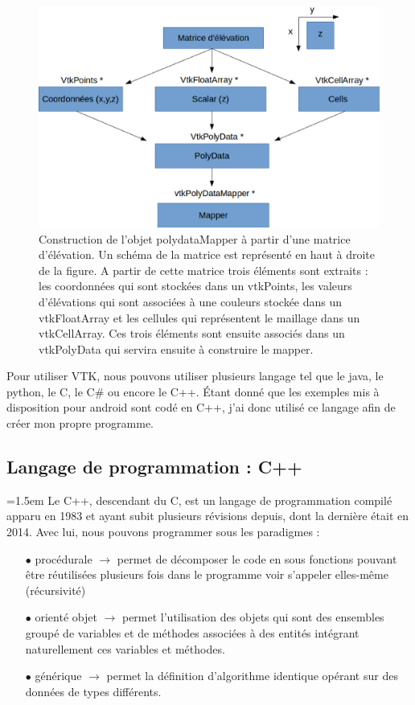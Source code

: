 \documentclass[a4paper,12pt]{article}
\begin{document}
\begin{figure}[h]
	\centering
	\includegraphics[width=15cm]{VTKMeth.eps}  
	\caption{Construction de l'objet polydataMapper à partir d'une matrice d'élévation. Un schéma de la matrice est représenté en haut à droite de la figure. A partir de cette matrice trois éléments sont extraits : les coordonnées qui sont stockées dans un vtkPoints, les valeurs d'élévations qui sont associées à une couleurs stockée dans un vtkFloatArray et les cellules qui représentent le maillage dans un vtkCellArray. Ces trois éléments sont ensuite associés dans un vtkPolyData qui servira ensuite à construire le mapper.}
	\label{fig:VTKMeth}
\end{figure} 

Pour utiliser VTK, nous pouvons utiliser plusieurs langage tel que le java, le python, le C, le C\# ou encore le C++. Étant donné que les exemples mis à disposition pour android sont codé en C++, j'ai donc utilisé ce langage afin de créer mon propre programme.
	\subsection{Langage de programmation : C++}	
\parindent=1.5em
	Le C++, descendant du C, est un langage de programmation compilé apparu en 1983 et ayant subit plusieurs révisions depuis, dont la dernière était en 2014. Avec lui, nous pouvons programmer sous les paradigmes : 
\begin{itemize}\setlength{\itemsep}{1mm}
	 \item[$\bullet$] procédurale $\rightarrow$ permet de décomposer le code en sous fonctions pouvant être réutilisées plusieurs fois dans le programme voir s'appeler elles-même (récursivité)
	 \item[$\bullet$] orienté objet $\rightarrow$ permet l'utilisation des objets qui sont des ensembles groupé de variables et de méthodes associées à des entités intégrant naturellement ces variables et méthodes.
	 \item[$\bullet$] générique $\rightarrow$ permet la définition d'algorithme identique opérant sur des données de types différents.
\end{itemize}
 
\end{document}

